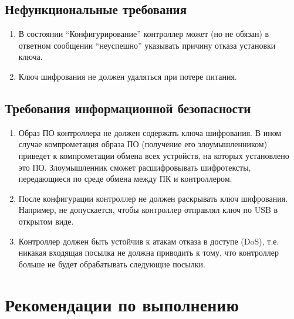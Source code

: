 \documentclass[14pt]{extarticle}
\begin{document}
\subsection{Нефункциональные требования}

\begin{enumerate}

 \item В состоянии ``Конфигурирование'' контроллер может (но не обязан) в
  ответном сообщении ``неуспешно'' указывать причину отказа установки ключа.

 \item Ключ шифрования не должен удаляться при потере питания.

\end{enumerate}

\subsection{Требования информационной безопасности}

\begin{enumerate}

 \item Образ ПО контроллера не должен содержать ключа шифрования.
  В ином случае компрометация образа ПО (получение его злоумышленником) приведет
  к компрометации обмена всех устройств, на которых установлено это ПО.
  Злоумышленник сможет расшифровывать шифротексты, передающиеся по среде обмена
  между ПК и контроллером.

 \item После конфигурации контроллер не должен раскрывать ключ шифрования.
  Например, не допускается, чтобы контроллер отправлял ключ по USB в открытом
  виде.

 \item Контроллер должен быть устойчив к атакам отказа в доступе (DoS), т.е.
  никакая входящая посылка не должна приводить к тому, что контроллер больше не будет
  обрабатывать следующие посылки.

\end{enumerate}

\section{Рекомендации по выполнению}
\end{document}
